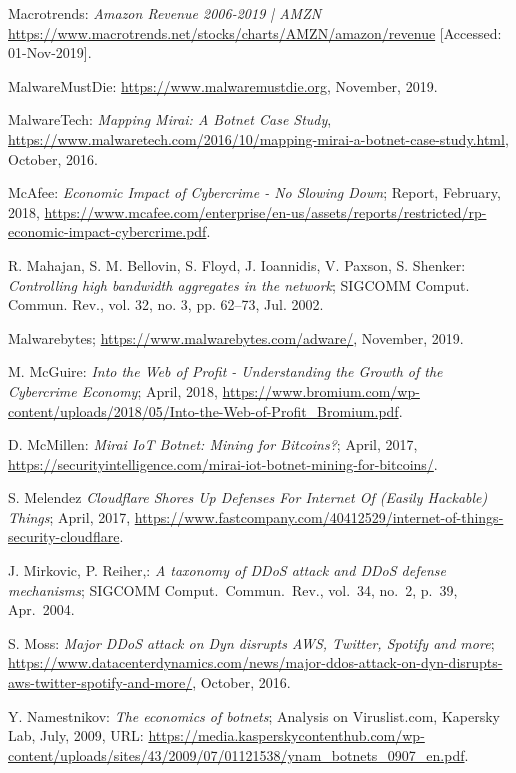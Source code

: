 \begin{thebibliography}{99}
 Macrotrends: \emph{Amazon Revenue 2006-2019 | AMZN} \url{https://www.macrotrends.net/stocks/charts/AMZN/amazon/revenue} [Accessed: 01-Nov-2019].

 MalwareMustDie: \url{https://www.malwaremustdie.org}, November, 2019.

 MalwareTech: \emph{Mapping Mirai: A Botnet Case Study}, \url{https://www.malwaretech.com/2016/10/mapping-mirai-a-botnet-case-study.html}, October, 2016.

 McAfee: \emph{Economic Impact of Cybercrime - No Slowing Down}; Report, February, 2018, \url{https://www.mcafee.com/enterprise/en-us/assets/reports/restricted/rp-economic-impact-cybercrime.pdf}.

 R. Mahajan, S. M. Bellovin, S. Floyd, J. Ioannidis, V. Paxson, S. Shenker: \emph{Controlling high bandwidth aggregates in the network}; SIGCOMM Comput. Commun. Rev., vol. 32, no. 3, pp. 62--73, Jul. 2002.

 Malwarebytes; \url{https://www.malwarebytes.com/adware/}, November, 2019.

 M. McGuire: \emph{Into the Web of Profit - Understanding the Growth of the Cybercrime Economy}; April, 2018, \url{https://www.bromium.com/wp-content/uploads/2018/05/Into-the-Web-of-Profit_Bromium.pdf}.

 D. McMillen: \emph{Mirai IoT Botnet: Mining for Bitcoins?}; April, 2017, \url{https://securityintelligence.com/mirai-iot-botnet-mining-for-bitcoins/}.

 S. Melendez \emph{Cloudflare Shores Up Defenses For Internet Of (Easily Hackable) Things}; April, 2017, \url{https://www.fastcompany.com/40412529/internet-of-things-security-cloudflare}.

 J. Mirkovic, P. Reiher,: \emph{A taxonomy of DDoS attack and DDoS defense mechanisms}; SIGCOMM Comput.\ Commun.\ Rev., vol.\ 34, no.\ 2, p.\ 39, Apr.\ 2004.

 S. Moss: \emph{Major DDoS attack on Dyn disrupts AWS, Twitter, Spotify and more}; \url{https://www.datacenterdynamics.com/news/major-ddos-attack-on-dyn-disrupts-aws-twitter-spotify-and-more/}, October, 2016.

 Y. Namestnikov: \emph{The economics of botnets}; Analysis on Viruslist.com, Kapersky Lab, July, 2009, URL: \url{https://media.kasperskycontenthub.com/wp-content/uploads/sites/43/2009/07/01121538/ynam_botnets_0907_en.pdf}.


\end{thebibliography}
